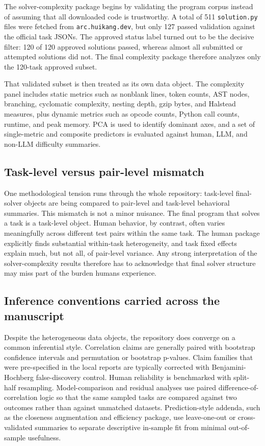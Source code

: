 The solver-complexity package begins by validating the program corpus instead of assuming that all downloaded code is trustworthy. A total of 511 \texttt{solution.py} files were fetched from \texttt{arc.huikang.dev}, but only 127 passed validation against the official task JSONs. The approved status label turned out to be the decisive filter: 120 of 120 approved solutions passed, whereas almost all submitted or attempted solutions did not. The final complexity package therefore analyzes only the 120-task approved subset.

That validated subset is then treated as its own data object. The complexity panel includes static metrics such as nonblank lines, token counts, AST nodes, branching, cyclomatic complexity, nesting depth, gzip bytes, and Halstead measures, plus dynamic metrics such as opcode counts, Python call counts, runtime, and peak memory. PCA is used to identify dominant axes, and a set of single-metric and composite predictors is evaluated against human, LLM, and non-LLM difficulty summaries.

\subsection{Task-level versus pair-level mismatch}

One methodological tension runs through the whole repository: task-level final-solver objects are being compared to pair-level and task-level behavioral summaries. This mismatch is not a minor nuisance. The final program that solves a task is a task-level object. Human behavior, by contrast, often varies meaningfully across different test pairs within the same task. The human package explicitly finds substantial within-task heterogeneity, and task fixed effects explain much, but not all, of pair-level variance. Any strong interpretation of the solver-complexity results therefore has to acknowledge that final solver structure may miss part of the burden humans experience.

\subsection{Inference conventions carried across the manuscript}

Despite the heterogeneous data objects, the repository does converge on a common inferential style. Correlation claims are generally paired with bootstrap confidence intervals and permutation or bootstrap p-values. Claim families that were pre-specified in the local reports are typically corrected with Benjamini-Hochberg false-discovery control. Human reliability is benchmarked with split-half resampling. Model-comparison and residual analyses use paired difference-of-correlation logic so that the same sampled tasks are compared against two outcomes rather than against unmatched datasets. Prediction-style addenda, such as the closeness augmentation and efficiency package, use leave-one-out or cross-validated summaries to separate descriptive in-sample fit from minimal out-of-sample usefulness.

